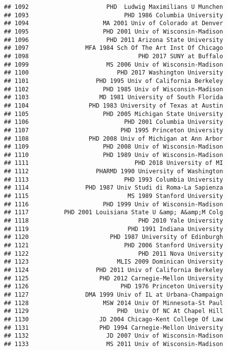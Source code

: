 \documentclass[
]{article}
\begin{document}
\begin{verbatim}
## 1092                      PHD  Ludwig Maximilians U Munchen
## 1093                           PHD 1986 Columbia University
## 1094                     MA 2001 Univ of Colorado at Denver
## 1095                     PHD 2001 Univ of Wisconsin-Madison
## 1096                      PHD 2011 Arizona State University
## 1097                MFA 1984 Sch Of The Art Inst Of Chicago
## 1098                               PHD 2017 SUNY at Buffalo
## 1099                      MS 2006 Univ of Wisconsin-Madison
## 1100                         PHD 2017 Washington University
## 1101                   PHD 1995 Univ of California Berkeley
## 1102                     PHD 1985 Univ of Wisconsin-Madison
## 1103                    MD 1981 University of South Florida
## 1104                 PHD 1983 University of Texas at Austin
## 1105                     PHD 2005 Michigan State University
## 1106                           PHD 2001 Columbia University
## 1107                          PHD 1995 Princeton University
## 1108                 PHD 2008 Univ of Michigan at Ann Arbor
## 1109                     PHD 2008 Univ of Wisconsin-Madison
## 1110                     PHD 1989 Univ of Wisconsin-Madison
## 1111                              PHD 2018 University of MI
## 1112                   PHARMD 1990 University of Washington
## 1113                           PHD 1993 Columbia University
## 1114                PHD 1987 Univ Studi di Roma-La Sapienza
## 1115                            MS 1989 Stanford University
## 1116                     PHD 1999 Univ of Wisconsin-Madison
## 1117          PHD 2001 Louisiana State U &amp; A&amp;M Colg
## 1118                               PHD 2010 Yale University
## 1119                            PHD 1991 Indiana University
## 1120                       PHD 1987 University of Edinburgh
## 1121                           PHD 2006 Stanford University
## 1122                               PHD 2011 Nova University
## 1123                         MLIS 2009 Dominican University
## 1124                   PHD 2011 Univ of California Berkeley
## 1125                    PHD 2012 Carnegie-Mellon University
## 1126                          PHD 1976 Princeton University
## 1127                DMA 1999 Univ of IL at Urbana-Champaign
## 1128                     MSW 2014 Univ Of Minnesota-St Paul
## 1129                         PHD  Univ Of NC At Chapel Hill
## 1130                    JD 2004 Chicago-Kent College Of Law
## 1131                    PHD 1994 Carnegie-Mellon University
## 1132                      JD 2007 Univ of Wisconsin-Madison
## 1133                      MS 2011 Univ of Wisconsin-Madison

\end{verbatim}
\end{document}
